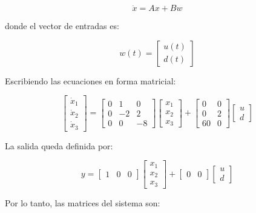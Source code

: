 \documentclass[12pt,a4paper]{article}
\begin{document}
\begin{equation}\dot{x}=Ax+Bw\end{equation}

donde el vector de entradas es:

\begin{equation}w(t)=\begin{bmatrix}u(t)\\d(t)\end{bmatrix}\end{equation}

Escribiendo las ecuaciones en forma matricial:

\begin{equation}\begin{bmatrix}\dot{x}_1\\\dot{x}_2\\\dot{x}_3\end{bmatrix}=\begin{bmatrix}0&1&0\\0&-2&2\\0&0&-8\end{bmatrix} \begin{bmatrix}x_1\\x_2\\x_3\end{bmatrix}+\begin{bmatrix}0&0\\0&2\\60&0\end{bmatrix} \begin{bmatrix}u\\d\end{bmatrix}\end{equation}

La salida queda definida por:

\begin{equation}y=\begin{bmatrix}1&0&0\end{bmatrix} \begin{bmatrix}x_1\\x_2\\x_3\end{bmatrix}+\begin{bmatrix}0&0\end{bmatrix} \begin{bmatrix}u\\d\end{bmatrix}\end{equation}

Por lo tanto, las matrices del sistema son:
\end{document}
